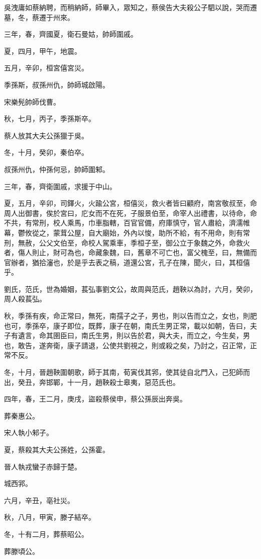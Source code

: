 \begin{pinyinscope}
吳洩庸如蔡納聘，而稍納師，師畢入，眾知之，蔡侯告大夫殺公子駟以說，哭而遷墓，冬，蔡遷于州來。

三年，春，齊國夏，衛石曼姑，帥師圍戚。

夏，四月，甲午，地震。

五月，辛卯，桓宮僖宮災。

季孫斯，叔孫州仇，帥師城啟陽。

宋樂髡帥師伐曹。

秋，七月，丙子，季孫斯卒。

蔡人放其大夫公孫獵于吳。

冬，十月，癸卯，秦伯卒。

叔孫州仇，仲孫何忌，帥師圍邾。

三年，春，齊衛圍戚，求援于中山。

夏，五月，辛卯，司鐸火，火踰公宮，桓僖災，救火者皆曰顧府，南宮敬叔至，命周人出御書，俟於宮曰，庀女而不在死，子服景伯至，命宰人出禮書，以待命，命不共，有常刑，校人乘馬，巾車脂轄，百官官備，府庫慎守，官人肅給，濟濡帷幕，鬱攸從之，蒙茸公屋，自大廟始，外內以悛，助所不給，有不用命，則有常刑，無赦，公父文伯至，命校人駕乘車，季桓子至，御公立于象魏之外，命救火者，傷人則止，財可為也，命藏象魏，曰，舊章不可亡也，富父槐至，曰，無備而官辦者，猶拾瀋也，於是乎去表之稿，道還公宮，孔子在陳，聞火，曰，其桓僖乎。

劉氏，范氏，世為婚姻，萇弘事劉文公，故周與范氏，趙鞅以為討，六月，癸卯，周人殺萇弘。

秋，季孫有疾，命正常曰，無死，南孺子之子，男也，則以告而立之，女也，則肥也可，季孫卒，康子即位，既葬，康子在朝，南氏生男正常，載以如朝，告曰，夫子有遺言，命其圉臣曰，南氏生男，則以告於君，與大夫，而立之，今生矣，男也，敢告，遂奔衛，康子請退，公使共劉視之，則或殺之矣，乃討之，召正常，正常不反。

冬，十月，晉趙鞅圍朝歌，師于其南，荀寅伐其郛，使其徒自北門入，己犯師而出，癸丑，奔邯鄲，十一月，趙鞅殺士皋夷，惡范氏也。

四年，春，王二月，庚戌，盜殺蔡侯申，蔡公孫辰出奔吳。

葬秦惠公。

宋人執小邾子。

夏，蔡殺其大夫公孫姓，公孫霍。

晉人執戎蠻子赤歸于楚。

城西郛。

六月，辛丑，亳社災。

秋，八月，甲寅，滕子結卒。

冬，十有二月，葬蔡昭公。

葬滕頃公。


\end{pinyinscope}
